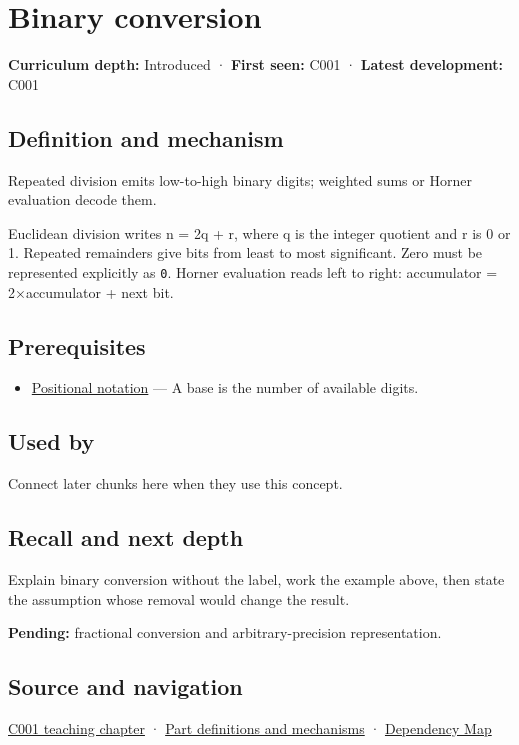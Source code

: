 \hypertarget{appendix-dc552784a2c0}{}\label{referencestart:appendix-dc552784a2c0}
\section{Binary conversion}\label{appendix-dc552784a2c0-binary-conversion}

\textbf{Curriculum depth:} Introduced · \textbf{First seen:} C001 · \textbf{Latest development:} C001

\subsection{Definition and mechanism}\label{appendix-dc552784a2c0-definition-and-mechanism}

Repeated division emits low-to-high binary digits; weighted sums or Horner evaluation decode them.

Euclidean division writes n = 2q + r, where q is the integer quotient and r is 0 or 1. Repeated remainders give bits from least to most significant. Zero must be represented explicitly as \texttt{0}. Horner evaluation reads left to right: accumulator = 2×accumulator + next bit.

\subsection{Prerequisites}\label{appendix-dc552784a2c0-prerequisites}

\begin{itemize}
\tightlist
\item
  \hyperref[appendix-83c3f28f7bda]{Positional notation} --- A base is the number of available digits.
\end{itemize}

\subsection{Used by}\label{appendix-dc552784a2c0-used-by}

Connect later chunks here when they use this concept.

\subsection{Recall and next depth}\label{appendix-dc552784a2c0-recall-and-next-depth}

Explain binary conversion without the label, work the example above, then state the assumption whose removal would change the result.

\textbf{Pending:} fractional conversion and arbitrary-precision representation.

\subsection{Source and navigation}\label{appendix-dc552784a2c0-source-and-navigation}

\hyperref[01-foundations-i-ch001-from-a-signal-to-an-interpretation]{C001 teaching chapter} · \hyperref[appendix-fd090d982a15]{Part definitions and mechanisms} · \hyperref[appendix-4ad47bdd269a]{Dependency Map}
